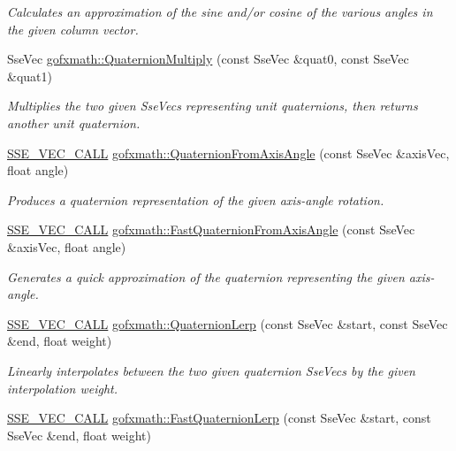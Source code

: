 \begin{DoxyCompactItemize}
\begin{DoxyCompactList}\small\item\em Calculates an approximation of the sine and/or cosine of the various angles in the given column vector. \end{DoxyCompactList}\item 
Sse\+Vec \hyperlink{group___s_i_m_d_vec_math_ga0e384fad353b857ff4ef591d332f1ed5}{gofxmath\+::\+Quaternion\+Multiply} (const Sse\+Vec \&quat0, const Sse\+Vec \&quat1)
\begin{DoxyCompactList}\small\item\em Multiplies the two given Sse\+Vecs representing unit quaternions, then returns another unit quaternion. \end{DoxyCompactList}\item 
\hyperlink{ssevec__math__defs_8h_a97454f977a5281455cecacce1e8ba670}{S\+S\+E\+\_\+\+V\+E\+C\+\_\+\+C\+A\+L\+L} \hyperlink{group___s_i_m_d_vec_math_gaa2b75972dcdfee3ce9416c181e3232c4}{gofxmath\+::\+Quaternion\+From\+Axis\+Angle} (const Sse\+Vec \&axis\+Vec, float angle)
\begin{DoxyCompactList}\small\item\em Produces a quaternion representation of the given axis-\/angle rotation. \end{DoxyCompactList}\item 
\hyperlink{ssevec__math__defs_8h_a97454f977a5281455cecacce1e8ba670}{S\+S\+E\+\_\+\+V\+E\+C\+\_\+\+C\+A\+L\+L} \hyperlink{group___s_i_m_d_vec_math_gafc7d80c6545a113babc44f60d858982d}{gofxmath\+::\+Fast\+Quaternion\+From\+Axis\+Angle} (const Sse\+Vec \&axis\+Vec, float angle)
\begin{DoxyCompactList}\small\item\em Generates a quick approximation of the quaternion representing the given axis-\/angle. \end{DoxyCompactList}\item 
\hyperlink{ssevec__math__defs_8h_a97454f977a5281455cecacce1e8ba670}{S\+S\+E\+\_\+\+V\+E\+C\+\_\+\+C\+A\+L\+L} \hyperlink{group___s_i_m_d_vec_math_ga42795c54ec5735bb7aa2a164d3e6ed5c}{gofxmath\+::\+Quaternion\+Lerp} (const Sse\+Vec \&start, const Sse\+Vec \&end, float weight)
\begin{DoxyCompactList}\small\item\em Linearly interpolates between the two given quaternion Sse\+Vecs by the given interpolation weight. \end{DoxyCompactList}\item 
\hyperlink{ssevec__math__defs_8h_a97454f977a5281455cecacce1e8ba670}{S\+S\+E\+\_\+\+V\+E\+C\+\_\+\+C\+A\+L\+L} \hyperlink{group___s_i_m_d_vec_math_ga632ef80a1f66a0de3be83b4133470169}{gofxmath\+::\+Fast\+Quaternion\+Lerp} (const Sse\+Vec \&start, const Sse\+Vec \&end, float weight)

\end{DoxyCompactItemize}
